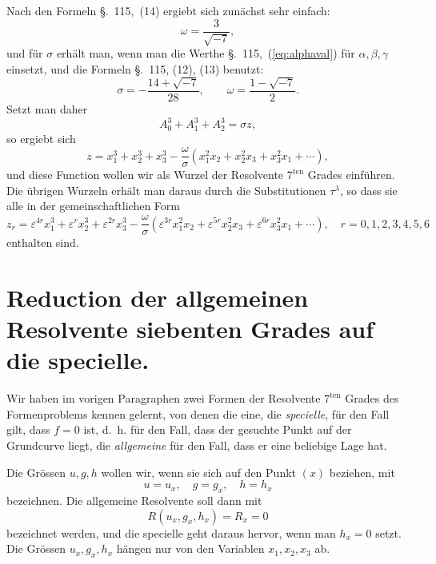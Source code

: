 \documentclass[12pt,a4paper]{article}
\begin{document}
Nach den Formeln \S.~115,~(14) ergiebt sich zun\"achst sehr einfach:
\[\omega = \frac{3}{\sqrt{-7}},\]
und f\"ur $\sigma$ erh\"alt man, wenn man die Werthe \S.~115,~(\ref{eq:alphaval}) f\"ur $\alpha, \beta, \gamma$ einsetzt, und die Formeln \S.~115, (12), (13) benutzt:
\begin{equation}
\label{eq:sigmaval} \sigma = -\frac{14 + \sqrt{-7}}{28}, \qquad \omega = \frac{1 - \sqrt{-7}}{2}.
\end{equation}
Setzt man daher
\[A_0^3 + A_1^3 + A_2^3 = \sigma z,\]
so ergiebt sich
\begin{equation}
\label{eq:zform} z = x_1^3 + x_2^3 + x_3^3 - \frac{\omega}{\sigma}(x_1^2 x_2 + x_2^2 x_3 + x_3^2 x_1 + \cdots),
\end{equation}
und diese Function wollen wir als Wurzel der Resolvente $7^{\text{ten}}$ Grades einf\"uhren. Die \"ubrigen Wurzeln erh\"alt man daraus durch die Substitutionen $\tau^{\lambda}$, so dass sie alle in der gemeinschaftlichen Form
\begin{equation}
\label{eq:zr} z_r = \varepsilon^{4r}x_1^3 + \varepsilon^{r}x_2^3 + \varepsilon^{2r}x_3^3 - \frac{\omega}{\sigma}(\varepsilon^{3r}x_1^2 x_2 + \varepsilon^{5r}x_2^2 x_3 + \varepsilon^{6r}x_3^2 x_1 + \cdots), \quad r = 0, 1, 2, 3, 4, 5, 6
\end{equation}
enthalten sind.

\newpage
\section{Reduction der allgemeinen Resolvente siebenten Grades auf die specielle.}
\label{sec:126}

Wir haben im vorigen Paragraphen zwei Formen der Resolvente $7^{\text{ten}}$ Grades des Formenproblems kennen gelernt, von denen die eine, die \textit{specielle}, f\"ur den Fall gilt, dass $f = 0$ ist, d.~h. f\"ur den Fall, dass der gesuchte Punkt auf der Grundcurve liegt, die \textit{allgemeine} f\"ur den Fall, dass er eine beliebige Lage hat.

Die Gr\"ossen $u, g, h$ wollen wir, wenn sie sich auf den Punkt $(x)$ beziehen, mit
\begin{equation}
\label{eq:ugh} u = u_x, \quad g = g_x, \quad h = h_x
\end{equation}
bezeichnen. Die allgemeine Resolvente soll dann mit
\begin{equation}
\label{eq:R} R(u_x, g_x, h_x) = R_x = 0
\end{equation}
bezeichnet werden, und die specielle geht daraus hervor, wenn man $h_x = 0$ setzt. Die Gr\"ossen $u_x, g_x, h_x$ h\"angen nur von den Variablen $x_1, x_2, x_3$ ab.
\end{document}
